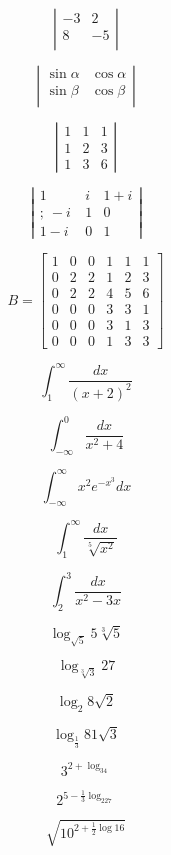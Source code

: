 \documentclass[10pt,a4paper]{article}
\begin{document}
$$
\left| \begin{array}{ccc}
-3 & 2 \\
8 & -5 \\
\end{array} \right|
$$

$$
\left| \begin{array}{ccc}
\sin\alpha & \cos\alpha \\
\sin\beta & \cos\beta \\
\end{array} \right|
$$

$$
\left| \begin{array}{ccc}
1 & 1 & 1 \\
1 & 2 & 3 \\
1 & 3 & 6
\end{array} \right|
$$

$$
\left| \begin{array}{ccc}
1 & i & 1+i \\
;\ -i\ & 1 & 0 \\
1-i & 0 & 1
\end{array} \right|
$$

$$
B =\left[ \begin{array}{c|cc|ccc}
1 & 0 & 0 & 1 & 1 & 1 \\
\hline
0 & 2 & 2 & 1 & 2 & 3 \\
0 & 2 & 2 & 4 & 5 & 6 \\
\hline
0 & 0 & 0 & 3 & 3 & 1 \\
0 & 0 & 0 & 3 & 1 & 3 \\
0 & 0 & 0 & 1 & 3 & 3   
\end{array} \right]
$$


$$
\int^{\infty}_1 \frac{dx}{(x+2)^2}
$$

$$
\int^{0}_{-\infty} \frac{dx}{x^2+4}
$$

$$
\int^{\infty}_{-\infty} x^2 e^{-x^3}dx
$$

$$
\int^{\infty}_{1} \frac{dx}{\sqrt[5]{x^2}}
$$

$$
\int^{3}_{2} \frac{dx}{x^2-3x}
$$

$$
\log_{\sqrt{5}}5\sqrt[3]{5}
$$

$$
\log_{\sqrt[3]{3}}27
$$

$$
\log_2 8\sqrt{2}
$$


$$
\log_\frac{1}{3}81\sqrt{3}
$$

$$
3^{2+\log_34}
$$

$$
2^{5-\frac{1}{3}\log_227}
$$

$$
\sqrt{10^{2+\frac{1}{2}\log16}}
$$
\end{document}
